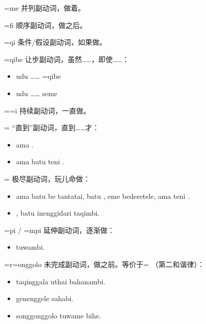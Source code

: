 \begin{des}
    \item[\V=me] 并列副动词，做着\V 。
    \item[\V=fi] 顺序副动词，做\V 之后。 
    \item[\V=qi] 条件/假设副动词，如果做\V 。
    \item[\V=qibe] 让步副动词，虽然……，即使……：
        \begin{itemize}
            \item udu …… \V=qibe
            \item udu …… seme
        \end{itemize}
    \item[\V=\HA=i] 持续副动词，一直做\V 。
    \item[\V=\ii{=tala}{=tele}{=tolo}] “直到”副动词，直到……才：
        \begin{itemize}
            \item {}  ama  .
            \item ama  batu teni . 
        \end{itemize}
    \item[\V=\ii{=tai}{=tei}{=toi}] 极尽副动词，玩儿命做\V ：
        \begin{itemize}
            \item ama batu be tantatai, batu , eme bederetele, ama teni .
            \item {}  , batu inenggidari  taqimbi.
        \end{itemize}
    \item[\V=pi / \V=mpi] 延伸副动词，逐渐做\V ：
        \begin{itemize}
            \item {}  tuwambi.
        \end{itemize}
    \item[\V=r=\AIfina onggolo] 未完成副动词，做\V 之前。等价于\V= （第二和谐律）：
        \begin{itemize}
            \item taqinggala uthai bahanambi.
            \item genenggele  sahabi.
            \item songgonggolo  tuwame bihe.
        \end{itemize}

\end{des}
